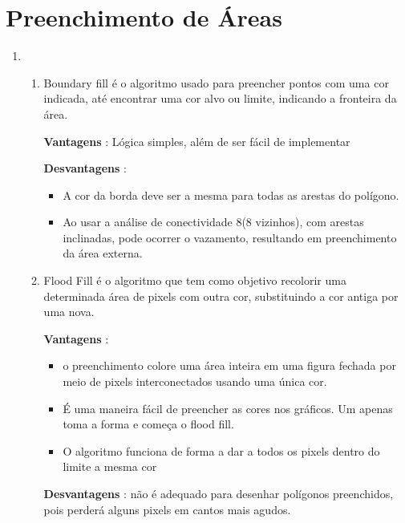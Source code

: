 \section*{Preenchimento de Áreas}

  \begin{enumerate}[label=\arabic*)] \addtocounter{enumi}{34}
   
   		\item 
   		
        \begin{enumerate}[label=\alph*.]
		\setlength\itemsep{1em}
		
		\item Boundary fill é o algoritmo usado para preencher pontos com uma cor
		indicada, até encontrar uma cor alvo ou limite, indicando a fronteira da área.

		\textbf{Vantagens} : Lógica simples, além de ser fácil de implementar
		
		\textbf{Desvantagens} : 
		
		\begin{itemize}
			\item A cor da borda deve ser a mesma para todas as arestas do polígono.
			\item Ao usar a análise de conectividade 8(8 vizinhos), com arestas inclinadas, pode
			ocorrer o vazamento, resultando em preenchimento da área externa.
		\end{itemize}
		
		\item Flood Fill é o algoritmo que tem como objetivo recolorir uma determinada área de
		pixels com outra cor, substituindo a cor antiga por uma nova.
	
		\textbf{Vantagens} : 
		
		\begin{itemize}
			\item o preenchimento colore uma área inteira em uma figura fechada por meio de pixels interconectados usando uma única cor.
			\item  É uma maneira fácil de preencher as cores nos gráficos. Um apenas toma a forma e começa o flood fill.
			\item  O algoritmo funciona de forma a dar a todos os pixels dentro do limite a mesma cor
		\end{itemize}

		\textbf{Desvantagens} : não é adequado para desenhar polígonos preenchidos, pois perderá alguns pixels em cantos mais agudos.
		

\end{enumerate}
\end{enumerate}
